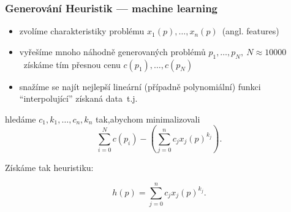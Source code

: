 \documentclass[red,handout,professionalfont]{beamer}
\theoremstyle{definition}
\newcommand{\0}{\mbox{${\bf 0}$}}
\begin{document}
\begin{frame}\frametitle{Generování Heuristik --- machine learning}
\begin{itemize}
 \item zvolíme charakteristiky problému $x_1(p),\ldots,x_n(p)$\pause\ (angl. features)\pause
 \item vyřešíme mnoho náhodně generovaných problémů $p_1,\ldots,p_N,\ N\approx 10000$\pause\ získáme tím přesnou cenu $c(p_1),\ldots,c(p_N)$
 \item snažíme se najít nejlepší lineární (případně polynomiální) funkci ``interpolující'' získaná data\pause\ t.j.
\end{itemize}

hledáme $c_1,k_1,\ldots,c_n,k_n$ tak,\pause abychom minimalizovali
\begin{displaymath}
\sum_{i=0}^N c(p_i) - \left(\sum_{j=0}^n c_j x_j(p)^{k_j}\right).
\end{displaymath}\pause

Získáme tak heuristiku:\pause

\begin{displaymath}
h(p) = \sum_{j=0}^n c_j x_j(p)^{k_j}.
\end{displaymath}\pause

\end{frame}
\end{document}
